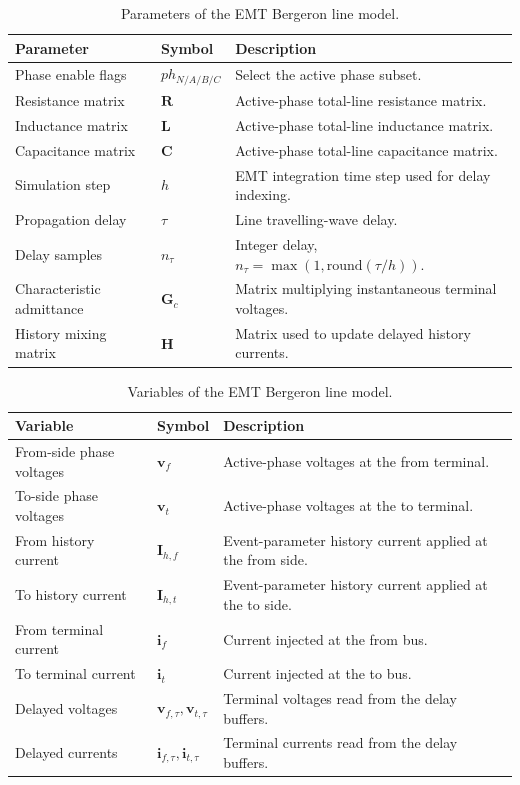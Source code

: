 \begin{table}[h]
\centering
\begin{tabular}{p{}p{}p{}}
\hline
Parameter & Symbol & Description \\
\hline
Phase enable flags & $ph_{N/A/B/C}$ & Select the active phase subset. \\
Resistance matrix & $\mathbf{R}$ & Active-phase total-line resistance matrix. \\
Inductance matrix & $\mathbf{L}$ & Active-phase total-line inductance matrix. \\
Capacitance matrix & $\mathbf{C}$ & Active-phase total-line capacitance matrix. \\
Simulation step & $h$ & EMT integration time step used for delay indexing. \\
Propagation delay & $\tau$ & Line travelling-wave delay. \\
Delay samples & $n_\tau$ & Integer delay, $n_\tau=\max(1,\mathrm{round}(\tau/h))$. \\
Characteristic admittance & $\mathbf{G}_c$ & Matrix multiplying instantaneous terminal voltages. \\
History mixing matrix & $\mathbf{H}$ & Matrix used to update delayed history currents. \\
\hline
\end{tabular}
\caption{Parameters of the EMT Bergeron line model.}
\end{table}

\begin{table}[h]
\centering
\begin{tabular}{p{}p{}p{}}
\hline
Variable & Symbol & Description \\
\hline
From-side phase voltages & $\mathbf{v}_f$ & Active-phase voltages at the from terminal. \\
To-side phase voltages & $\mathbf{v}_t$ & Active-phase voltages at the to terminal. \\
From history current & $\mathbf{I}_{h,f}$ & Event-parameter history current applied at the from side. \\
To history current & $\mathbf{I}_{h,t}$ & Event-parameter history current applied at the to side. \\
From terminal current & $\mathbf{i}_f$ & Current injected at the from bus. \\
To terminal current & $\mathbf{i}_t$ & Current injected at the to bus. \\
Delayed voltages & $\mathbf{v}_{f,\tau},\mathbf{v}_{t,\tau}$ & Terminal voltages read from the delay buffers. \\
Delayed currents & $\mathbf{i}_{f,\tau},\mathbf{i}_{t,\tau}$ & Terminal currents read from the delay buffers. \\
\hline
\end{tabular}
\caption{Variables of the EMT Bergeron line model.}
\end{table}

